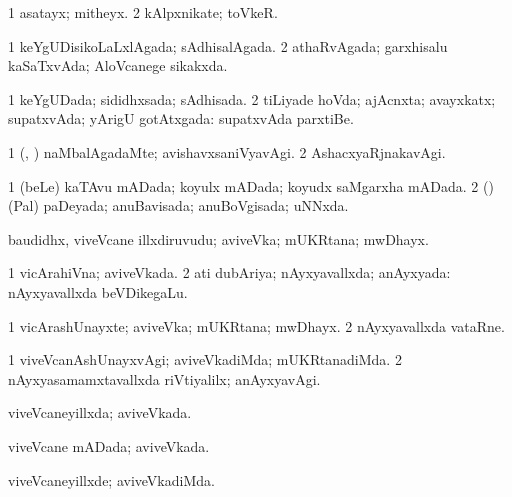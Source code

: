 {{\bentry
{} 
\gl{\nA}
\expl{}
\bmng
\bnum
\num{1} asatayx; mitheyx. 
\num{2} kAlpxnikate; toVkeR. 
\enum
\emng
\eentry

\bentry
{} 
\gl{\gu}
\expl{}
\bmng
\bnum
\num{1} keYgUDisikoLaLxlAgada; sAdhisalAgada. 
\num{2} athaRvAgada; garxhisalu kaSaTxvAda; AloVcanege sikakxda. 
\enum
\emng
\eentry

\bentry
{} 
\gl{\gu}
\expl{}
\bmng
\bnum
\num{1} keYgUDada; sididhxsada; sAdhisada. 
\num{2} tiLiyade hoVda; ajAcnxta; avayxkatx; supatxvAda; yArigU gotAtxgada:  supatxvAda parxtiBe. 
\enum
\emng
\eentry

\bentry
{} 
\gl{\kirxvi}
\expl{}
\bmng
\bnum
\num{1} (\ame, \ashi) naMbalAgadaMte; avishavxsaniVyavAgi. 
\num{2} AshacxyaRjnakavAgi. 
\enum
\emng
\eentry

\bentry
{} 
\gl{\gu}
\expl{}
\bmng
\bnum
\num{1} (beLe) kaTAvu mADada; koyulx mADada; koyudx saMgarxha mADada. 
\num{2} (\rUpa) (Pal) paDeyada; anuBavisada; anuBoVgisada; uNNxda. 
\enum
\emng
\eentry

\bentry
{} 
\gl{\nA}
\expl{}
\bmng
baudidhx, viveVcane illxdiruvudu; aviveVka; mUKRtana; mwDhayx. 
\emng
\eentry

\bentry
{} 
\gl{\gu}
\expl{}
\bmng
\bnum
\num{1} vicArahiVna; aviveVkada. 
\num{2} ati dubAriya; nAyxyavallxda; anAyxyada:  nAyxyavallxda beVDikegaLu. 
\enum
\emng
\eentry

\bentry
{} 
\gl{\nA}
\expl{}
\bmng
\bnum
\num{1} vicArashUnayxte; aviveVka; mUKRtana; mwDhayx. 
\num{2} nAyxyavallxda vataRne. 
\enum
\emng
\eentry

\bentry
{} 
\gl{\kirxvi}
\expl{}
\bmng
\bnum
\num{1} viveVcanAshUnayxvAgi; aviveVkadiMda; mUKRtanadiMda. 
\num{2} nAyxyasamamxtavallxda riVtiyalilx; anAyxyavAgi. 
\enum
\emng
\eentry

\bentry
{} 
\gl{\gu}
\expl{}
\bmng
viveVcaneyillxda; aviveVkada. 
\emng
\eentry

\bentry
{} 
\gl{\gu}
\expl{}
\bmng
viveVcane mADada; aviveVkada. 
\emng
\eentry

\bentry
{} 
\gl{\kirxvi}
\expl{}
\bmng
viveVcaneyillxde; aviveVkadiMda. 
\emng
\eentry

}}
